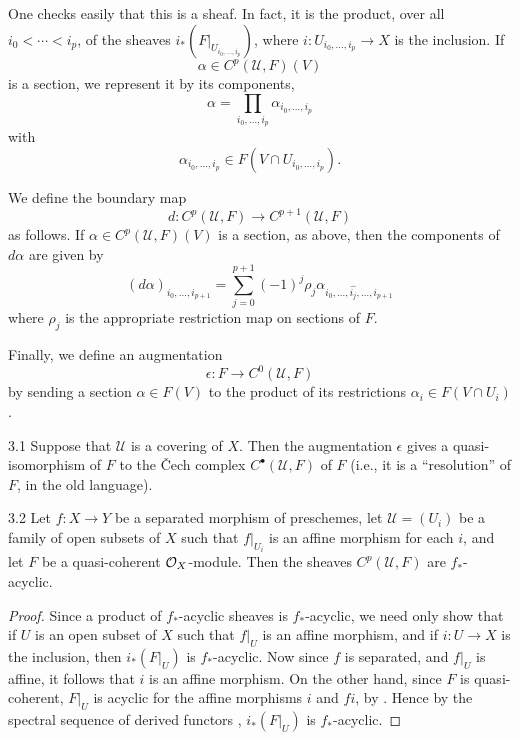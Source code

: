 One checks easily that this is a sheaf. In fact, it is the product, over all $i_0<\cdots<i_p$, of the sheaves $i_*(F|_{U_{i_0,\dots,i_p}})$, where $i\colon U_{i_0,\dots,i_p}\to X$ is the inclusion. If
\[
\alpha \in C^p(\mathcal{U},F)(V)
\]
is a section, we represent it by its components,
\[
\alpha = \prod_{i_0,\dots,i_p} \alpha_{i_0,\dots,i_p}
\]
with
\[
\alpha_{i_0,\dots,i_p} \in F(V\cap U_{i_0,\dots,i_p}).
\]

We define the boundary map
\[
d\colon C^p(\mathcal{U},F) \longrightarrow C^{p+1}(\mathcal{U},F)
\]
as follows. If $\alpha\in C^p(\mathcal{U},F)(V)$ is a section, as above, then the components of $d\alpha$ are given by
\[
(d\alpha)_{i_0,\dots,i_{p+1}} = \sum_{j=0}^{p+1} (-1)^j \rho_j \alpha_{i_0,\dots,\widehat{i_j},\dots,i_{p+1}}
\]
where $\rho_j$ is the appropriate restriction map on sections of $F$.

Finally, we define an augmentation
\[
\epsilon\colon F \longrightarrow C^0(\mathcal{U},F)
\]
by sending a section $\alpha\in F(V)$ to the product of its restrictions $\alpha_i\in F(V\cap U_i)$.

\begin{bookproposition}{3.1}\label{prop:3.3.1}
\cite[\nopp II,~5.2.1]{G} Suppose that $\mathcal{U}$ is a covering of $X$. Then the augmentation $\epsilon$ gives a quasi-isomorphism of $F$ to the \v{C}ech complex $C^\bullet(\mathcal{U},F)$ of $F$ (i.e., it is a ``resolution'' of $F$, in the old language).
\end{bookproposition}

\begin{bookproposition}{3.2}\label{prop:3.3.2}
Let $f\colon X\to Y$ be a separated morphism of preschemes, let $\mathcal{U}=(U_i)$ be a family of open subsets of $X$ such that $f|_{U_i}$ is an affine morphism for each $i$, and let $F$ be a quasi-coherent $\mathcal{O}_X$-module. Then the sheaves $C^p(\mathcal{U},F)$ are $f_*$-acyclic.
\end{bookproposition}

\begin{proof}
Since a product of $f_*$-acyclic sheaves is $f_*$-acyclic, we need only show that if $U$ is an open subset of $X$ such that $f|_U$ is an affine morphism, and if $i\colon U\to X$ is the inclusion, then $i_*(F|_U)$ is $f_*$-acyclic. Now since $f$ is separated, and $f|_U$ is affine, it follows that $i$ is an affine morphism. On the other hand, since $F$ is quasi-coherent, $F|_U$ is acyclic for the affine morphisms $i$ and $fi$, by \cite[\nopp III,~1.3.2]{EGA}. Hence by the spectral sequence of derived functors , $i_*(F|_U)$ is $f_*$-acyclic.
\end{proof}

